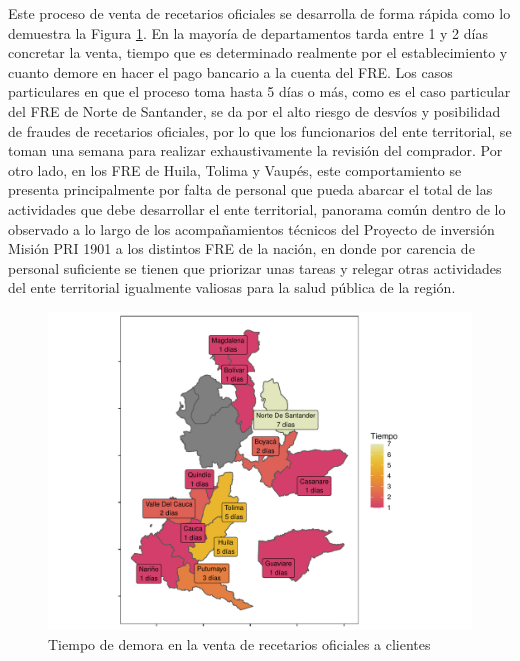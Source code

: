 \documentclass[
]{book}
\begin{document}
Este proceso de venta de recetarios oficiales se desarrolla de forma rápida como lo demuestra la Figura \ref{fig:TiempoVentaInstituciones}. En la mayoría de departamentos tarda entre 1 y 2 días concretar la venta, tiempo que es determinado realmente por el establecimiento y cuanto demore en hacer el pago bancario a la cuenta del FRE. Los casos particulares en que el proceso toma hasta 5 días o más, como es el caso particular del FRE de Norte de Santander, se da por el alto riesgo de desvíos y posibilidad de fraudes de recetarios oficiales, por lo que los funcionarios del ente territorial, se toman una semana para realizar exhaustivamente la revisión del comprador. Por otro lado, en los FRE de Huila, Tolima y Vaupés, este comportamiento se presenta principalmente por falta de personal que pueda abarcar el total de las actividades que debe desarrollar el ente territorial, panorama común dentro de lo observado a lo largo de los acompañamientos técnicos del Proyecto de inversión Misión PRI 1901 a los distintos FRE de la nación, en donde por carencia de personal suficiente se tienen que priorizar unas tareas y relegar otras actividades del ente territorial igualmente valiosas para la salud pública de la región.

\begin{figure}

{\centering \includegraphics[width=0.9\linewidth]{InformeFinal_files/figure-latex/TiempoVentaInstituciones-1} 

}

\caption{Tiempo de demora en la venta de recetarios oficiales a clientes}\label{fig:TiempoVentaInstituciones}
\end{figure}
\end{document}
